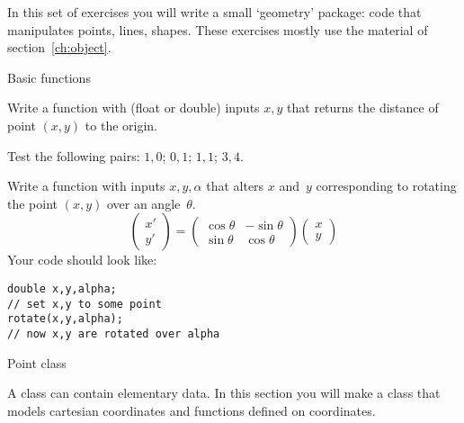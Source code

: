 
In this set of exercises you will write a small `geometry' package:
code that manipulates points, lines, shapes.
These exercises mostly use the material of section~\ref{ch:object}.

 {Basic functions}
\label{sec:geom-basic}

\begin{exercise}
  \label{ex:func-pointdistance}
  Write a function with (float or double) inputs $x,y$ that returns the distance of
  point $(x,y)$ to the origin.

  Test the following pairs: $1,0$; $0,1$; $1,1$; $3,4$.
\end{exercise}

\begin{exercise}
  \label{ex:pointrotate}
  Write a function with inputs $x,y,\alpha$ that alters $x$ and~$y$
  corresponding to rotating the point $(x,y)$ over an angle~$\theta$.
  \[
  \begin{pmatrix}
    x'\\y'
  \end{pmatrix} =
  \begin{pmatrix}
    \cos\theta& -\sin\theta\\ \sin\theta&\cos\theta
  \end{pmatrix}
  \begin{pmatrix}
    x\\y
  \end{pmatrix}
  \]
  Your code should look like:
\begin{verbatim}
double x,y,alpha;
// set x,y to some point
rotate(x,y,alpha);
// now x,y are rotated over alpha
\end{verbatim}
\end{exercise}

 {Point class}
\label{ex:pointfunc}

\prerequisite{\ref{sec:object}}

A class can contain elementary data. In this section you will make a
 class that models cartesian coordinates and functions
defined on coordinates.

